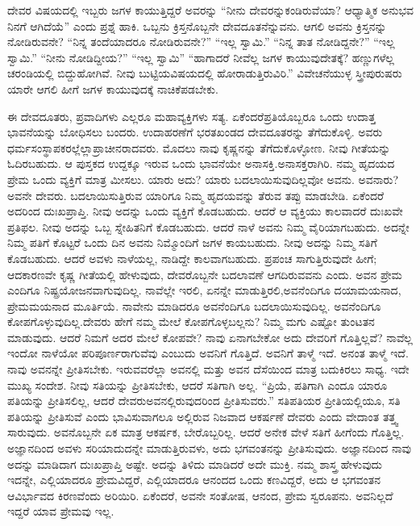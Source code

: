 ದೇವರ ವಿಷಯದಲ್ಲಿ ಇಬ್ಬರು ಜಗಳ ಕಾಯುತ್ತಿದ್ದರೆ ಅವರನ್ನು “ನೀನು ದೇವರನ್ನು\break ಕಂಡಿರುವೆಯಾ? ಆಧ್ಯಾತ್ಮಿಕ ಅನುಭವ ನಿನಗೆ ಆಗಿದೆಯೆ” ಎಂದು ಪ್ರಶ್ನೆ ಹಾಕಿ. ಒಬ್ಬನು ಕ್ರಿಸ್ತನೊಬ್ಬನೇ ದೇವದೂತನೆನ್ನುವನು. ಆಗಲಿ ಅವನು ಕ್ರಿಸ್ತನನ್ನು ನೋಡಿರುವನೇ? “ನಿನ್ನ ತಂದೆಯಾದರೂ ನೋಡಿರುವನೇ?” “ಇಲ್ಲ ಸ್ವಾಮಿ.” “ನಿನ್ನ ತಾತ ನೋಡಿದ್ದನೇ?” “ಇಲ್ಲ ಸ್ವಾಮಿ.” “ನೀನು ನೋಡಿದ್ದೀಯ?” “ಇಲ್ಲ ಸ್ವಾಮಿ” “ಹಾಗಾದರೆ ನೀವೆಲ್ಲ ಜಗಳ ಕಾಯುವು\-ದೇತಕ್ಕೆ? ಹಣ್ಣುಗಳೆಲ್ಲ ಚರಂಡಿಯಲ್ಲಿ ಬಿದ್ದುಹೋಗಿವೆ. ನೀವು ಬುಟ್ಟಿಯ\break ವಿಷಯದಲ್ಲಿ ಹೋರಾಡುತ್ತಿರುವಿರಿ.” ವಿವೇಚನೆಯುಳ್ಳ ಸ್ತ್ರೀಪುರುಷರು ಯಾರೇ ಆಗಲಿ ಹೀಗೆ ಜಗಳ ಕಾಯುವುದಕ್ಕೆ ನಾಚಿಕೆಪಡಬೇಕು.

ಈ ದೇವದೂತರು, ಪ್ರವಾದಿಗಳು ಎಲ್ಲರೂ ಮಹಾವ್ಯಕ್ತಿಗಳು ಸತ್ಯ. ಏಕೆಂದರೆ\break ಪ್ರತಿಯೊಬ್ಬರೂ ಒಂದು ಉದಾತ್ತ ಭಾವನೆಯನ್ನು ಬೋಧಿಸಲು ಬಂದರು. ಉದಾಹರಣೆಗೆ ಭರತಖಂಡದ ದೇವದೂತರನ್ನು ತೆಗೆದುಕೊಳ್ಳಿ. ಅವರು ಧರ್ಮಸಂಸ್ಥಾಪಕರಲ್ಲೆಲ್ಲಾ\break ಪ್ರಾಚೀನರಾದವರು. ಮೊದಲು ನಾವು ಕೃಷ್ಣನನ್ನು ತೆಗೆದುಕೊಳ್ಳೋಣ. ನೀವು ಗೀತೆಯನ್ನು ಓದಿರಬಹುದು. ಆ ಪುಸ್ತಕದ ಉದ್ದಕ್ಕೂ ಇರುವ ಒಂದು ಭಾವನೆಯೇ ಅನಾಸಕ್ತಿ.\break ಅನಾಸಕ್ತರಾಗಿರಿ. ನಮ್ಮ ಹೃದಯದ ಪ್ರೇಮ ಒಂದು ವ್ಯಕ್ತಿಗೆ ಮಾತ್ರ ಮೀಸಲು. ಯಾರು ಅದು? ಯಾರು ಬದಲಾಯಿಸುವುದಿಲ್ಲವೋ ಅವನು. ಅವನಾರು? ಅವನೇ ದೇವರು. ಬದ\-ಲಾಯಿಸುತ್ತಿರುವ ಯಾರಿಗೂ ನಿಮ್ಮ ಹೃದಯವನ್ನು ತೆರುವ ತಪ್ಪು ಮಾಡಬೇಡಿ. ಏಕೆಂದರೆ ಅದರಿಂದ ದುಃಖಪ್ರಾಪ್ತಿ. ನೀವು ಅದನ್ನು ಒಂದು ವ್ಯಕ್ತಿಗೆ ಕೊಡಬಹುದು. ಆದರೆ ಆ ವ್ಯಕ್ತಿಯು ಕಾಲವಾದರೆ ದುಃಖವೇ ಪ್ರತಿಫಲ. ನೀವು ಅದನ್ನು ಒಬ್ಬ ಸ್ನೇಹಿತನಿಗೆ ಕೊಡಬಹುದು. ಆದರೆ ನಾಳೆ ಅವನು ನಿಮ್ಮ ವೈರಿಯಾಗಬಹುದು. ಅದನ್ನೇ ನಿಮ್ಮ ಪತಿಗೆ ಕೊಟ್ಟರೆ ಒಂದು ದಿನ ಅವನು ನಿಮ್ಮೊಂದಿಗೆ ಜಗಳ ಕಾಯಬಹುದು. ನೀವು ಅದನ್ನು ನಿಮ್ಮ ಸತಿಗೆ ಕೊಡಬಹುದು. ಆದರೆ ಅವಳು ನಾಳೆಯಲ್ಲ, ನಾಡಿದ್ದೇ ಕಾಲವಾಗಬಹುದು. ಪ್ರಪಂಚ ಸಾಗುತ್ತಿರುವುದೇ ಹೀಗೆ; ಆದಕಾರಣವೇ ಕೃಷ್ಣ ಗೀತೆಯಲ್ಲಿ ಹೇಳುವುದು, ದೇವರೊಬ್ಬನೇ ಬದಲಾವಣೆ ಆಗದಿರುವವನು ಎಂದು. ಅವನ ಪ್ರೇಮ ಎಂದಿಗೂ ನಿಷ್ಪ್ರಯೋಜನವಾಗುವುದಿಲ್ಲ. ನಾವೆಲ್ಲೇ ಇರಲಿ, ಏನನ್ನೇ ಮಾಡುತ್ತಿರಲಿ,\break ಅವನೆಂದಿಗೂ ದಯಾಮಯನಾದ, ಪ್ರೇಮಮಯನಾದ ಮೂರ್ತಿಯೆ. ನಾವೇನು ಮಾಡಿದರೂ ಅವನೆಂದಿಗೂ ಬದಲಾಯಿಸುವುದಿಲ್ಲ. ಅವನೆಂದಿಗೂ ಕೋಪಗೊಳ್ಳುವುದಿಲ್ಲ.\break ದೇವರು ಹೇಗೆ ನಮ್ಮ ಮೇಲೆ ಕೋಪಗೊಳ್ಳಬಲ್ಲನು? ನಿಮ್ಮ ಮಗು ಎಷ್ಟೋ ತುಂಟತನ ಮಾಡುವುದು. ಆದರೆ ನಿಮಗೆ ಅದರ ಮೇಲೆ ಕೋಪವೇ? ನಾವು ಏನಾಗಬೇಕೋ ಅದು ದೇವರಿಗೆ ಗೊತ್ತಿಲ್ಲವೆ? ನಾವೆಲ್ಲ ಇಂದೋ ನಾಳೆಯೋ ಪರಿಪೂರ್ಣರಾಗುವೆವು ಎಂಬುದು ಅವನಿಗೆ ಗೊತ್ತಿದೆ. ಅವನಿಗೆ ತಾಳ್ಮೆ ಇದೆ. ಅನಂತ ತಾಳ್ಮೆ ಇದೆ. ನಾವು ಅವನನ್ನೇ ಪ್ರೀತಿಸಬೇಕು. ಇರುವವರೆಲ್ಲಾ ಅವನಲ್ಲಿ ಮತ್ತು ಅವನ ದೆಸೆಯಿಂದ ಮಾತ್ರ ಬದುಕಿರಲು ಸಾಧ್ಯ. ಇದೇ ಮುಖ್ಯ ಸಂದೇಶ. ನೀವು ಸತಿಯನ್ನು ಪ್ರೀತಿಸಬೇಕು, ಆದರೆ ಸತಿಗಾಗಿ ಅಲ್ಲ. “ಪ್ರಿಯೆ, ಪತಿಗಾಗಿ ಎಂದೂ ಯಾರೂ ಪತಿಯನ್ನು ಪ್ರೀತಿಸಲಿಲ್ಲ, ಆದರೆ ದೇವರು\break ಅವನಲ್ಲಿರುವುದರಿಂದ ಪ್ರೀತಿಸುವರು.” ಸತಿಪತಿಯರ ಪ್ರೀತಿಯಲ್ಲಿಯೂ, ಸತಿ ಪತಿಯನ್ನು ಪ್ರೀತಿಸುವೆ ಎಂದು ಭಾವಿಸುವಾಗಲೂ ಅಲ್ಲಿರುವ ನಿಜವಾದ ಆಕರ್ಷಣೆ ದೇವರು ಎಂದು ವೇದಾಂತ ತತ್ತ್ವ ಸಾರುವುದು. ಅವನೊಬ್ಬನೇ ಏಕ ಮಾತ್ರ ಆಕರ್ಷಕ, ಬೇರೊಬ್ಬರಿಲ್ಲ. ಆದರೆ ಅನೇಕ ವೇಳೆ ಸತಿಗೆ ಹೀಗೆಂದು ಗೊತ್ತಿಲ್ಲ. ಅಜ್ಞಾನದಿಂದ ಅವಳು ಸರಿಯಾದುದನ್ನೇ ಮಾಡುತ್ತಿರುವಳು, ಅದು ಭಗವಂತನನ್ನು ಪ್ರೀತಿಸುವುದು. ಅಜ್ಞಾನದಿಂದ ನಾವು ಅದನ್ನು ಮಾಡಿದಾಗ ದುಃಖಪ್ರಾಪ್ತಿ ಅಷ್ಟೇ. ಅದನ್ನು ತಿಳಿದು ಮಾಡಿದರೆ ಅದೇ ಮುಕ್ತಿ. ನಮ್ಮ ಶಾಸ್ತ್ರ ಹೇಳುವುದು ಇದನ್ನೇ, ಎಲ್ಲಿಯಾದರೂ ಪ್ರೇಮವಿದ್ದರೆ, ಎಲ್ಲಿಯಾದರೂ ಆನಂದದ ಒಂದು ಕಣವಿದ್ದರೆ, ಅದು ಆ ಭಗವಂತನ ಆವಿರ್ಭಾವದ ಕಿರಣವೆಂದು ಅರಿಯಿರಿ. ಏಕೆಂದರೆ, ಅವನೇ ಸಂತೋಷ, ಆನಂದ, ಪ್ರೇಮ ಸ್ವರೂಪನು. ಅವನಿಲ್ಲದೆ ಇದ್ದರೆ ಯಾವ ಪ್ರೇಮವು ಇಲ್ಲ.


